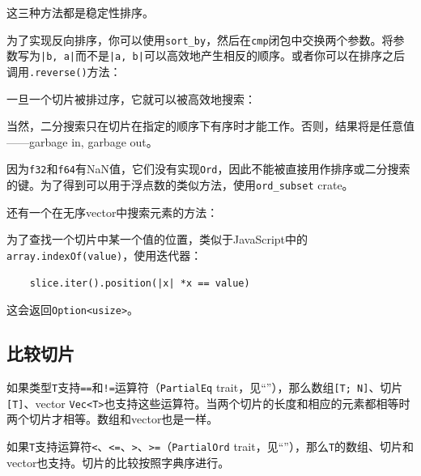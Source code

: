 这三种方法都是稳定性排序。

为了实现反向排序，你可以使用\texttt{sort\_by}，然后在\texttt{cmp}闭包中交换两个参数。将参数写为\texttt{|b, a|}而不是\texttt{|a, b|}可以高效地产生相反的顺序。或者你可以在排序之后调用\texttt{.reverse()}方法：


一旦一个切片被排过序，它就可以被高效地搜索：

当然，二分搜索只在切片在指定的顺序下有序时才能工作。否则，结果将是任意值——garbage in, garbage out。

因为\texttt{f32}和\texttt{f64}有NaN值，它们没有实现\texttt{Ord}，因此不能被直接用作排序或二分搜索的键。为了得到可以用于浮点数的类似方法，使用\texttt{ord\_subset} crate。

还有一个在无序vector中搜索元素的方法：


为了查找一个切片中某一个值的位置，类似于JavaScript中的\texttt{array.indexOf(value)}，使用迭代器：
\begin{verbatim}
    slice.iter().position(|x| *x == value)
\end{verbatim}
这会返回\texttt{Option<usize>}。

\subsection{比较切片}
如果类型\texttt{T}支持\texttt{==}和\texttt{!=}运算符（\texttt{PartialEq} trait，见“”），那么数组\texttt{[T; N]}、切片\texttt{[T]}、vector \texttt{Vec<T>}也支持这些运算符。当两个切片的长度和相应的元素都相等时两个切片才相等。数组和vector也是一样。

如果\texttt{T}支持运算符\texttt{<}、\texttt{<=}、\texttt{>}、\texttt{>=}（\texttt{PartialOrd} trait，见“”），那么\texttt{T}的数组、切片和vector也支持。切片的比较按照字典序进行。

